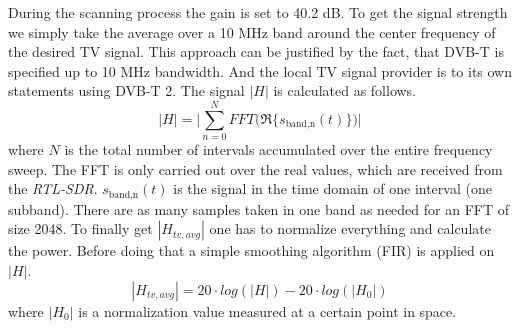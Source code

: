 \documentclass[conference]{IEEEtran}
\begin{document}
During the scanning process the gain is set to 40.2 dB. To get the
signal strength we simply take the average over a 10 MHz band around the
center frequency of the desired TV signal. This approach can be
justified by the fact, that DVB-T is specified up to 10 MHz bandwidth.
And the local TV signal provider is to its own statements using DVB-T 2.
The signal \ensuremath{|H|} is calculated as follows.  
\begin{equation}
	|H| = \Biggl| \sum_{n=0}^N FFT\biggl( \Re\{ s_{\text{band,n}}(t) \} \biggr) \Biggr|
\end{equation}     
where \ensuremath{N} is the total number of intervals accumulated over
the entire frequency sweep. The FFT
is only carried out over the real values, which are received from the
\textit{RTL-SDR}. \ensuremath{s_{\text{band,n}}(t)} is the signal in the
time domain of one interval (one subband). There are as many samples taken in one band as
needed for an FFT of size 2048. To finally get \ensuremath{|H_{tv,avg}|} one has to normalize everything and calculate the power. Before doing that a simple smoothing algorithm (FIR) is applied on \ensuremath{|H|}.
\begin{equation}
	|H_{tv,avg}| = 20 \cdot log (|H|) - 20 \cdot log(|H_0|)
\end{equation}   
where \ensuremath{|H_0|} is a normalization value measured at a certain
point in space. 
\end{document}
